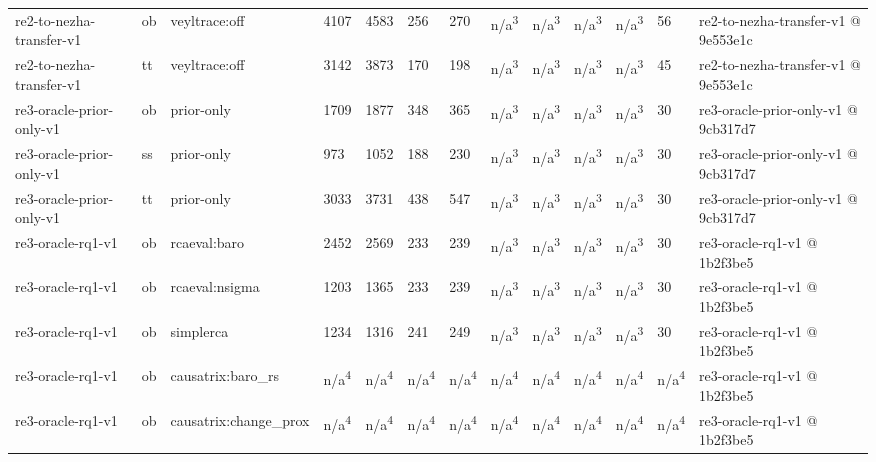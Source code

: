 \begin{table}[t]
\begin{tabular}{lllllllllllll}
re2-to-nezha-transfer-v1 & ob & veyltrace:off & 4107 & 4583 & 256 & 270 & n/a\textsuperscript{3} & n/a\textsuperscript{3} & n/a\textsuperscript{3} & n/a\textsuperscript{3} & 56 & re2-to-nezha-transfer-v1 @ 9e553e1c \\
re2-to-nezha-transfer-v1 & tt & veyltrace:off & 3142 & 3873 & 170 & 198 & n/a\textsuperscript{3} & n/a\textsuperscript{3} & n/a\textsuperscript{3} & n/a\textsuperscript{3} & 45 & re2-to-nezha-transfer-v1 @ 9e553e1c \\
re3-oracle-prior-only-v1 & ob & prior-only & 1709 & 1877 & 348 & 365 & n/a\textsuperscript{3} & n/a\textsuperscript{3} & n/a\textsuperscript{3} & n/a\textsuperscript{3} & 30 & re3-oracle-prior-only-v1 @ 9cb317d7 \\
re3-oracle-prior-only-v1 & ss & prior-only & 973 & 1052 & 188 & 230 & n/a\textsuperscript{3} & n/a\textsuperscript{3} & n/a\textsuperscript{3} & n/a\textsuperscript{3} & 30 & re3-oracle-prior-only-v1 @ 9cb317d7 \\
re3-oracle-prior-only-v1 & tt & prior-only & 3033 & 3731 & 438 & 547 & n/a\textsuperscript{3} & n/a\textsuperscript{3} & n/a\textsuperscript{3} & n/a\textsuperscript{3} & 30 & re3-oracle-prior-only-v1 @ 9cb317d7 \\
re3-oracle-rq1-v1 & ob & rcaeval:baro & 2452 & 2569 & 233 & 239 & n/a\textsuperscript{3} & n/a\textsuperscript{3} & n/a\textsuperscript{3} & n/a\textsuperscript{3} & 30 & re3-oracle-rq1-v1 @ 1b2f3be5 \\
re3-oracle-rq1-v1 & ob & rcaeval:nsigma & 1203 & 1365 & 233 & 239 & n/a\textsuperscript{3} & n/a\textsuperscript{3} & n/a\textsuperscript{3} & n/a\textsuperscript{3} & 30 & re3-oracle-rq1-v1 @ 1b2f3be5 \\
re3-oracle-rq1-v1 & ob & simplerca & 1234 & 1316 & 241 & 249 & n/a\textsuperscript{3} & n/a\textsuperscript{3} & n/a\textsuperscript{3} & n/a\textsuperscript{3} & 30 & re3-oracle-rq1-v1 @ 1b2f3be5 \\
re3-oracle-rq1-v1 & ob & causatrix:baro\_rs & n/a\textsuperscript{4} & n/a\textsuperscript{4} & n/a\textsuperscript{4} & n/a\textsuperscript{4} & n/a\textsuperscript{4} & n/a\textsuperscript{4} & n/a\textsuperscript{4} & n/a\textsuperscript{4} & n/a\textsuperscript{4} & re3-oracle-rq1-v1 @ 1b2f3be5 \\
re3-oracle-rq1-v1 & ob & causatrix:change\_prox & n/a\textsuperscript{4} & n/a\textsuperscript{4} & n/a\textsuperscript{4} & n/a\textsuperscript{4} & n/a\textsuperscript{4} & n/a\textsuperscript{4} & n/a\textsuperscript{4} & n/a\textsuperscript{4} & n/a\textsuperscript{4} & re3-oracle-rq1-v1 @ 1b2f3be5 \\

\end{tabular}
\end{table}

